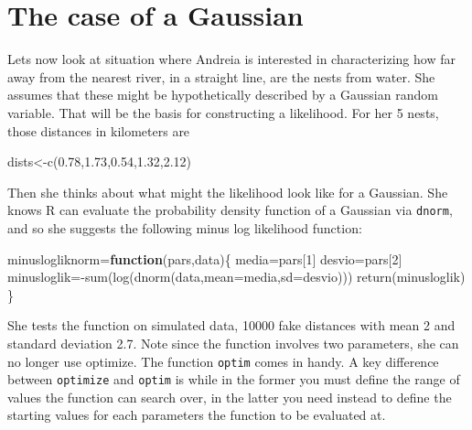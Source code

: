 \documentclass[
]{book}
\newenvironment{Shaded}{\begin{snugshade}}{\end{snugshade}}
\newcommand{\AttributeTok}[1]{\textcolor[rgb]{0.77,0.63,0.00}{#1}}
\newcommand{\ControlFlowTok}[1]{\textcolor[rgb]{0.13,0.29,0.53}{\textbf{#1}}}
\newcommand{\DecValTok}[1]{\textcolor[rgb]{0.00,0.00,0.81}{#1}}
\newcommand{\FloatTok}[1]{\textcolor[rgb]{0.00,0.00,0.81}{#1}}
\newcommand{\FunctionTok}[1]{\textcolor[rgb]{0.00,0.00,0.00}{#1}}
\newcommand{\NormalTok}[1]{#1}
\newcommand{\OtherTok}[1]{\textcolor[rgb]{0.56,0.35,0.01}{#1}}
\newcommand{\SpecialCharTok}[1]{\textcolor[rgb]{0.00,0.00,0.00}{#1}}
\begin{document}
\hypertarget{the-case-of-a-gaussian}{%
\section{The case of a Gaussian}\label{the-case-of-a-gaussian}}

Lets now look at situation where Andreia is interested in characterizing how far away from the nearest river, in a straight line, are the nests from water. She assumes that these might be hypothetically described by a Gaussian random variable. That will be the basis for constructing a likelihood. For her 5 nests, those distances in kilometers are

\begin{Shaded}
\begin{Highlighting}[]
\NormalTok{dists}\OtherTok{\textless{}{-}}\FunctionTok{c}\NormalTok{(}\FloatTok{0.78}\NormalTok{,}\FloatTok{1.73}\NormalTok{,}\FloatTok{0.54}\NormalTok{,}\FloatTok{1.32}\NormalTok{,}\FloatTok{2.12}\NormalTok{)}
\end{Highlighting}
\end{Shaded}

Then she thinks about what might the likelihood look like for a Gaussian. She knows R can evaluate the probability density function of a Gaussian via \texttt{dnorm}, and so she suggests the following minus log likelihood function:

\begin{Shaded}
\begin{Highlighting}[]
\NormalTok{minuslogliknorm}\OtherTok{=}\ControlFlowTok{function}\NormalTok{(pars,data)\{}
\NormalTok{  media}\OtherTok{=}\NormalTok{pars[}\DecValTok{1}\NormalTok{]}
\NormalTok{  desvio}\OtherTok{=}\NormalTok{pars[}\DecValTok{2}\NormalTok{]}
\NormalTok{  minusloglik}\OtherTok{=}\SpecialCharTok{{-}}\FunctionTok{sum}\NormalTok{(}\FunctionTok{log}\NormalTok{(}\FunctionTok{dnorm}\NormalTok{(data,}\AttributeTok{mean=}\NormalTok{media,}\AttributeTok{sd=}\NormalTok{desvio)))}
  \FunctionTok{return}\NormalTok{(minusloglik)}
\NormalTok{\}}
\end{Highlighting}
\end{Shaded}

She tests the function on simulated data, 10000 fake distances with mean 2 and standard deviation 2.7. Note since the function involves two parameters, she can no longer use optimize. The function \texttt{optim} comes in handy. A key difference between \texttt{optimize} and \texttt{optim} is while in the former you must define the range of values the function can search over, in the latter you need instead to define the starting values for each parameters the function to be evaluated at.
\end{document}
